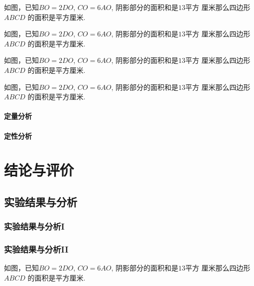 \documentclass{USTBBook}
\begin{document}

\begin{question*}
  如图，已知$BO=2DO$, $CO=6AO$, 阴影部分的面积和是$13$平方
  厘米那么四边形 $ABCD$ 的面积是\fillin[]平方厘米.
\end{question*}

\begin{question*}
  如图，已知$BO=2DO$, $CO=6AO$, 阴影部分的面积和是$13$平方
  厘米那么四边形 $ABCD$ 的面积是\fillin[]平方厘米.
\end{question*}

\begin{question*}
  如图，已知$BO=2DO$, $CO=6AO$, 阴影部分的面积和是$13$平方
  厘米那么四边形 $ABCD$ 的面积是\fillin[]平方厘米.
\end{question*}

\begin{question*}
  如图，已知$BO=2DO$, $CO=6AO$, 阴影部分的面积和是$13$平方
  厘米那么四边形 $ABCD$ 的面积是\fillin[]平方厘米.
\end{question*}

\subsection{定量分析}
\zhlipsum[16]

\subsection{定性分析}
\zhlipsum[17]

\part{结论与评价}
\ToggleSectionStyle
\ToggleQuestionStyle

\chapter{实验结果与分析}
\section{实验结果与分析I}
\zhlipsum[14]

\section{实验结果与分析II}

\begin{question}
  如图，已知$BO=2DO$, $CO=6AO$, 阴影部分的面积和是$13$平方
  厘米那么四边形 $ABCD$ 的面积是\fillin[]平方厘米.
\end{question}
\end{document}
